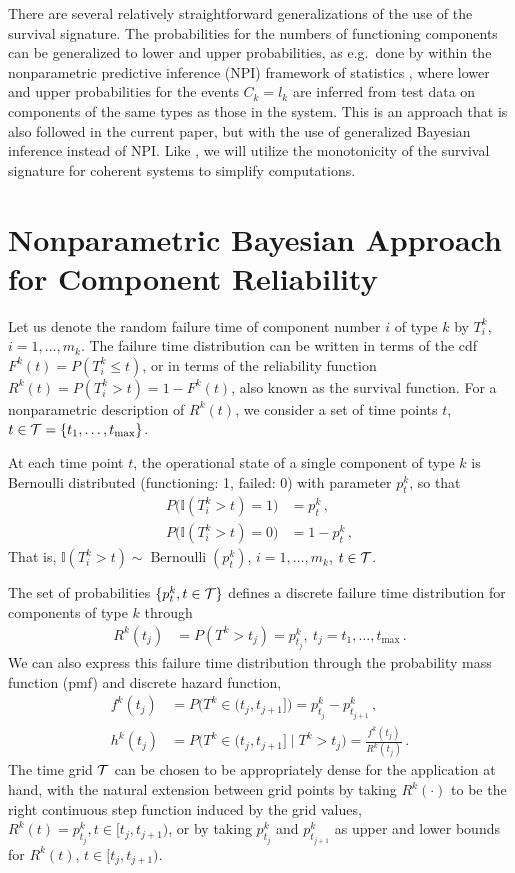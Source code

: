 \documentclass[12pt, a4paper]{elsarticle}
\newcommand{\indic}{\mathbb{I}}
\newcommand{\ber}{\operatorname{Bernoulli}}
\def\tmax{t_\text{max}}
\newcommand{\ptk}{p^k_t}
\begin{document}
There are several relatively straightforward generalizations of the use of the survival signature.
The probabilities for the numbers of functioning components can be generalized to lower and upper probabilities,
as e.g.\ done by \citet{CCMA14} within the nonparametric predictive inference (NPI) framework of statistics \citep{Co11},
where lower and upper probabilities for the events $C_k = l_k$
are inferred from test data on components of the same types as those in the system.
This is an approach that is also followed in the current paper, but with the use of generalized Bayesian inference instead of NPI.
Like \citet{CCMA14}, we will utilize the monotonicity of the survival signature for coherent systems
to simplify computations.


\section{Nonparametric Bayesian Approach for Component Reliability}
\label{sec:nonparamapproach}

Let us denote the random failure time of component number $i$ of type $k$ by $T^k_i$, $i = 1, \ldots, m_k$.
The failure time distribution can be written in terms of the cdf $F^k(t) = P(T^k_i \le t)$,
or in terms of the reliability function $R^k(t) = P(T^k_i > t) = 1 - F^k(t)$,
also known as the survival function.
For a nonparametric description of $R^k(t)$,
we consider a set of time points $t$, $t \in {\cal T} = \{t_1, \ldots, \tmax\}$.

At each time point $t$, the operational state of a single component of type $k$
is Bernoulli distributed (functioning: 1, failed: 0) with parameter $\ptk$, so that
\begin{align*}
P\big(\indic(T^k_i > t) = 1\big) &= \ptk\,, \\
P\big(\indic(T^k_i > t) = 0\big) &= 1 - \ptk\,,
\end{align*}
That is, $\indic(T^k_i > t) \sim \ber(\ptk)$, $i = 1, \ldots, m_k$, $t \in {\cal T}$.

The set of probabilities $\{ \ptk, t \in {\cal T}\}$
defines a discrete failure time distribution for components of type $k$ through
\begin{align*}
R^k(t_j) &= P(T^k > t_j) = p^k_{t_j},\ t_j = t_1, \ldots, \tmax\,.
\end{align*}
We can also express this failure time distribution through the probability mass function (pmf) and discrete hazard function,
\begin{align*}
f^k(t_j) &= P\big(T^k \in (t_j,t_{j+1}]\big) = p^k_{t_j} - p^k_{t_{j+1}}\,,\\ 
h^k(t_j) &= P\big(T^k \in (t_j,t_{j+1}]\mid T^k > t_j\big) = \frac{f^k(t_j)}{R^k(t_j)}\,. %
\end{align*}
The time grid $\cal T$ can be chosen to be appropriately dense for the application at hand,
with the natural extension between grid points by taking $R^k(\cdot)$ to be the right continuous step function induced by the grid values,
$R^k(t) = p^k_{t_j}, t \in [t_j, t_{j+1})$,
or by taking $p^k_{t_j}$ and $p^k_{t_{j+1}}$ as upper and lower bounds for $R^k(t)$, $t \in [t_j, t_{j+1})$.
\end{document}
